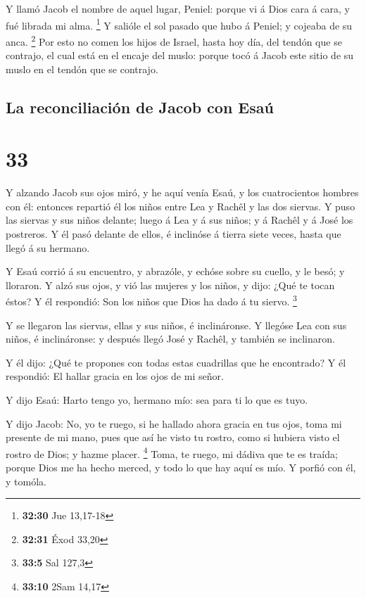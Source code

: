  Y llamó Jacob el nombre de aquel lugar, Peniel: porque vi
á Dios cara á cara, y fué librada mi alma. \footnote{\textbf{32:30} Jue
  13,17-18}  Y salióle el sol pasado que hubo á Peniel; y
cojeaba de su anca. \footnote{\textbf{32:31} Éxod 33,20} 
Por esto no comen los hijos de Israel, hasta hoy día, del tendón que se
contrajo, el cual está en el encaje del muslo: porque tocó á Jacob este
sitio de su muslo en el tendón que se contrajo.

\hypertarget{la-reconciliaciuxf3n-de-jacob-con-esauxfa}{%
\subsection{La reconciliación de Jacob con
Esaú}\label{la-reconciliaciuxf3n-de-jacob-con-esauxfa}}

\hypertarget{section-32}{%
\section{33}\label{section-32}}

 Y alzando Jacob sus ojos miró, y he aquí venía Esaú, y los
cuatrocientos hombres con él: entonces repartió él los niños entre Lea y
Rachêl y las dos siervas.  Y puso las siervas y sus niños
delante; luego á Lea y á sus niños; y á Rachêl y á José los postreros.
 Y él pasó delante de ellos, é inclinóse á tierra siete
veces, hasta que llegó á su hermano.

 Y Esaú corrió á su encuentro, y abrazóle, y echóse sobre su
cuello, y le besó; y lloraron.  Y alzó sus ojos, y vió las
mujeres y los niños, y dijo: ¿Qué te tocan éstos? Y él respondió: Son
los niños que Dios ha dado á tu siervo. \footnote{\textbf{33:5} Sal
  127,3}

 Y se llegaron las siervas, ellas y sus niños, é
inclináronse.  Y llegóse Lea con sus niños, é inclináronse:
y después llegó José y Rachêl, y también se inclinaron.

 Y él dijo: ¿Qué te propones con todas estas cuadrillas que
he encontrado? Y él respondió: El hallar gracia en los ojos de mi señor.

 Y dijo Esaú: Harto tengo yo, hermano mío: sea para ti lo
que es tuyo.

 Y dijo Jacob: No, yo te ruego, si he hallado ahora gracia
en tus ojos, toma mi presente de mi mano, pues que así he visto tu
rostro, como si hubiera visto el rostro de Dios; y hazme placer.
\footnote{\textbf{33:10} 2Sam 14,17}  Toma, te ruego, mi
dádiva que te es traída; porque Dios me ha hecho merced, y todo lo que
hay aquí es mío. Y porfió con él, y tomóla.


